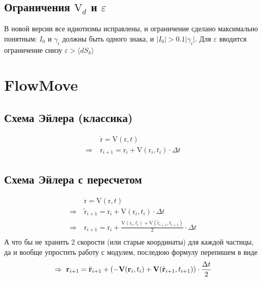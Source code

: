 \documentclass[a4paper,14pt]{extreport}
\newcommand{\br}[1]{\boldsymbol{\mathrm{#1}}}
\begin{document}
\subsection{Ограничения $\br V_d$ и $\varepsilon$}
В новой версии все идиотизмы исправлены, и ограничение сделано максимально понятным: $I_0$ и $\gamma_i$ должны быть одного знака, и $\lvert I_0 \rvert > 0.1 \lvert\gamma_i\rvert$. 
Для $\varepsilon$ вводится ограничение снизу $\varepsilon > \langle dS_k \rangle$

\newpage
\section{FlowMove}
\subsection{Схема Эйлера (классика)}
\begin{equation*}\begin{split}
&\dot{\br r} = \br V (\br r, t) \\
\Rightarrow~&\br r_{i+1} = \br r_i + \br V(\br r_i, t_i) \cdot \Delta t
\end{split}\end{equation*}

\subsection{Схема Эйлера с пересчетом}
\begin{equation*}\begin{split}
&\dot{\br r} = \br V (\br r, t) \\
\Rightarrow~&\tilde{\br r}_{i+1} = \br r_i + \br V(\br r_i, t_i) \cdot \Delta t \\
\Rightarrow~&\br r_{i+1} = \br r_i + 
\frac{\br V(\br r_i, t_i) + \br V( \tilde{\br r}_{i+1}, t_{i+1})}{2}\cdot \Delta t \\
\end{split}\end{equation*}
А что бы не хранить 2 скорости (или старые координаты) для
каждой частицы, да и вообще упростить работу с модулем,
последюю формулу перепишем в виде
\begin{equation*}
\Rightarrow~\br r_{i+1} = \tilde{\br r}_{i+1} + 
\left( -\br V(\br r_i, t_i) + \br V( \tilde{\br r}_{i+1}, t_{i+1}) \right)\cdot \frac{\Delta t}{2} \\
\end{equation*}
\end{document}
